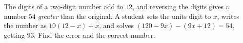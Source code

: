 The digits of a two-digit number add to $12$, and reversing the digits gives a number $54$ \emph{greater} than the original. A student sets the units digit to $x$, writes the number as $10(12-x)+x$, and solves $(120-9x)-(9x+12)=54$, getting $93$. Find the error and the correct number.
